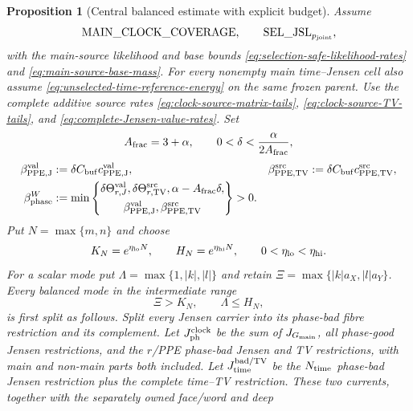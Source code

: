 \documentclass[11pt]{article}
\newtheorem{proposition}[theorem]{Proposition}
\begin{document}
\begin{proposition}[Central balanced estimate with explicit budget]
\label{prop:central-phase-verification}
Assume
\[
 \mathrm{MAIN\_CLOCK\_COVERAGE},\qquad
 \mathrm{SEL\_JSL}_{p_{\rm joint}},
\]
with the main-source likelihood and base bounds
\eqref{eq:selection-safe-likelihood-rates} and
\eqref{eq:main-source-base-mass}.  For every nonempty main time--Jensen cell
also assume \eqref{eq:unselected-time-reference-energy} on the same frozen
parent.  Use
the complete additive source rates
\eqref{eq:clock-source-matrix-tails},
\eqref{eq:clock-source-TV-tails}, and
\eqref{eq:complete-Jensen-value-rates}.  Set
\[
 A_{\rm frac}=3+\alpha,\qquad
 0<\delta<\frac{\alpha}{2A_{\rm frac}},
\]
\begin{equation}
\label{eq:complete-phase-exponent}
\begin{aligned}
 \beta_{\rm PPE,J}^{\rm val}&:=
   \delta C_{\rm buf}c_{\rm PPE,J}^{\rm val},
 &\beta_{\rm PPE,TV}^{\rm src}&:=
   \delta C_{\rm buf}c_{\rm PPE,TV}^{\rm src},\\
 \beta_{\rm phase}^{W}&:=
 \min\left\{
 \begin{gathered}
  \delta\Theta_{r,J}^{\rm val},
  \delta\Theta_{r,\rm TV}^{\rm src},
  \alpha-A_{\rm frac}\delta,\\
  \beta_{\rm PPE,J}^{\rm val},
  \beta_{\rm PPE,TV}^{\rm src}
 \end{gathered}
 \right\}>0.
\end{aligned}
\end{equation}
Put $N=\max\{m,n\}$ and choose
\begin{equation}
\label{eq:three-frequency-cutoffs}
 K_N=e^{\eta_{\rm lo}N},\qquad
 H_N=e^{\eta_{\rm hi}N},\qquad
 0<\eta_{\rm lo}<\eta_{\rm hi}.
\end{equation}
For a scalar mode put
$\Lambda=\max\{1,|k|,|l|\}$ and retain
$\Xi=\max\{|k|a_X,|l|a_Y\}$.  Every balanced mode in the intermediate range
\begin{equation}
\label{eq:intermediate-phase-range}
 \Xi>K_N,\qquad \Lambda\le H_N,
\end{equation}
is first split as follows.  Split every Jensen carrier into its phase-bad
fibre restriction and its complement.  Let $J_{\rm ph}^{\rm clock}$ be the
sum of $J_{G_{\rm main}}$, all phase-good Jensen restrictions, and the
$r$/PPE phase-bad Jensen and TV restrictions, with main and non-main parts
both included.  Let $J_{\rm time}^{\rm bad/TV}$ be the $N_{\rm time}$
phase-bad Jensen restriction plus the complete time--TV restriction.  These
two currents, together with the separately owned face/word and deep

\end{proposition}
\end{document}

